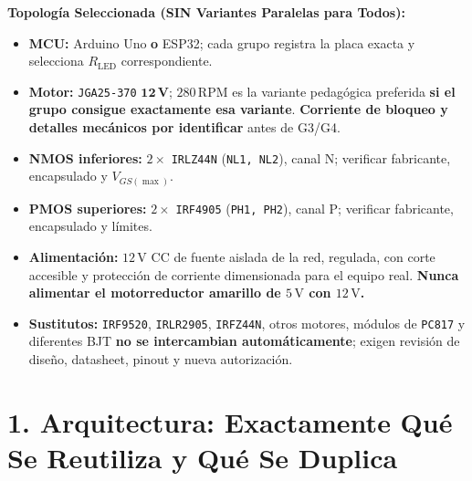 \documentclass[10pt, a4paper, landscape]{article}
\begin{document}
\begin{minipage}[t]{0.49\linewidth}
\textbf{Topología Seleccionada (SIN Variantes Paralelas para Todos):}
{\footnotesize
\begin{itemize}[noitemsep, topsep=2pt]
    \item \textbf{MCU:} Arduino Uno \textbf{o} ESP32; cada grupo registra la placa exacta y selecciona $R_{\text{LED}}$ correspondiente.
    \item \textbf{Motor:} \texttt{JGA25-370} $\mathbf{12\,\text{V}}$; $280\,\text{RPM}$ es la variante pedagógica preferida \textbf{si el grupo consigue exactamente esa variante}. \textbf{Corriente de bloqueo y detalles mecánicos por identificar} antes de G3/G4.
    \item \textbf{NMOS inferiores:} $2\times$ \texttt{IRLZ44N} (\texttt{NL1, NL2}), canal N; verificar fabricante, encapsulado y $V_{GS(\max)}$.
    \item \textbf{PMOS superiores:} $2\times$ \texttt{IRF4905} (\texttt{PH1, PH2}), canal P; verificar fabricante, encapsulado y límites.
    \item \textbf{Alimentación:} $12\,\text{V}$ CC de fuente aislada de la red, regulada, con corte accesible y protección de corriente dimensionada para el equipo real. \textbf{\textcolor{warnred}{Nunca alimentar el motorreductor amarillo de $5\,\text{V}$ con $12\,\text{V}$.}}
    \item \textbf{Sustitutos:} \texttt{IRF9520}, \texttt{IRLR2905}, \texttt{IRFZ44N}, otros motores, módulos de \texttt{PC817} y diferentes BJT \textbf{no se intercambian automáticamente}; exigen revisión de diseño, datasheet, pinout y nueva autorización.
\end{itemize}
}
\end{minipage}

\section*{1. Arquitectura: Exactamente Qué Se Reutiliza y Qué Se Duplica}
\end{document}
